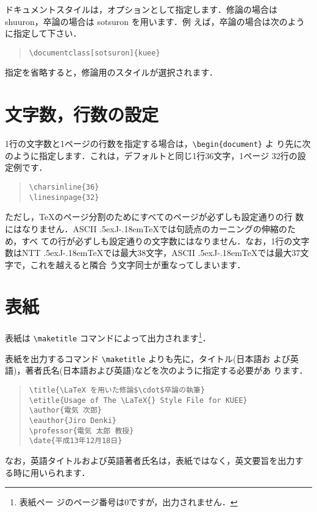 \documentclass{kuee}
\def\JTeX{\leavevmode\lower.5ex\hbox{J}\kern-.18em\TeX}
\begin{document}
ドキュメントスタイルは，オプションとして指定します．修論の場合は
{\ttfamily shuuron}，卒論の場合は {\ttfamily sotsuron} を用います．例
えば，卒論の場合は次のように指定して下さい．
\begin{quote}
\begin{verbatim}
\documentclass[sotsuron]{kuee}
\end{verbatim}
\end{quote}
指定を省略すると，修論用のスタイルが選択されます．


\section{文字数，行数の設定}

1行の文字数と1ページの行数を指定する場合は，\verb+\begin{document}+ よ
り先に次のように指定します．これは，デフォルトと同じ1行36文字，1ページ
32行の設定例です．
\begin{quote}
\begin{verbatim}
\charsinline{36}
\linesinpage{32}
\end{verbatim}
\end{quote}
ただし，\TeX のページ分割のためにすべてのページが必ずしも設定通りの行
数にはなりません．ASCII \JTeX では句読点のカーニングの伸縮のため，すべ
ての行が必ずしも設定通りの文字数にはなりません．なお，1行の文字数はNTT
\JTeX では最大38文字，ASCII \JTeX では最大37文字で，これを越えると隣合
う文字同士が重なってしまいます．


\section{表紙}
表紙は \verb+\maketitle+ コマンドによって出力されます\footnote{表紙ペー
ジのページ番号は0ですが，出力されません．}．

表紙を出力するコマンド \verb+\maketitle+ よりも先に，タイトル(日本語お
よび英語)，著者氏名(日本語および英語)などを次のように指定する必要があ
ります．
\begin{quote}
\begin{verbatim}
\title{\LaTeX を用いた修論$\cdot$卒論の執筆}
\etitle{Usage of The \LaTeX{} Style File for KUEE}
\author{電気 次郎}
\eauthor{Jiro Denki}
\professor{電気 太郎 教授}
\date{平成13年12月18日}
\end{verbatim}
\end{quote}
なお，英語タイトルおよび英語著者氏名は，表紙ではなく，英文要旨を出力す
る時に用いられます．
\end{document}
